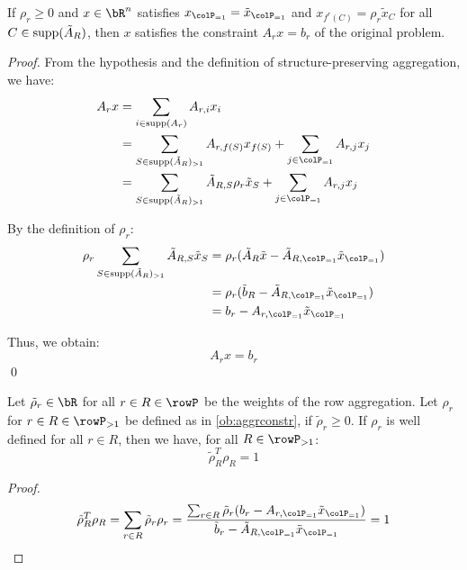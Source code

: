 {\begin{observation}
If \(\rho_r \geq 0\) and \(x \in \bR^n\) satisfies \(x_{\colP_{=1}} = \tilde{x}_{\colP_{=1}}\) and \(x_{f^r(C)} = \rho_r \tilde{x}_C\) for all \(C \in \operatorname{supp}(\tilde{A}_R)\), then \(x\) satisfies the constraint \(A_r x = b_r\) of the original problem.
\end{observation}

\begin{proof}
From the hypothesis and the definition of structure-preserving aggregation, we have:
\begin{align*}
A_r x &= \sum_{i \in \supp(A_r)} A_{r,i} x_i \\
&= \sum_{S \in \supp(\tilde{A}_R)_{>1}} A_{r,f(S)} x_{f(S)} + 
\sum_{j \in \colP_{=1}} A_{r,j} x_j \\
&= \sum_{S \in \supp(\tilde{A}_R)_{>1}} \tilde{A}_{R,S} \rho_r \tilde{x}_S + 
\sum_{j \in \colP_{=1}} A_{r,j} x_j
\end{align*}

By the definition of \(\rho_r\):
\begin{align*}
\rho_r \sum_{S \in \supp(\tilde{A}_R)_{>1}} \tilde{A}_{R,S} \tilde{x}_S 
&= \rho_r (\tilde{A}_R \tilde{x} - \tilde{A}_{R,\colP_{=1}} \tilde{x}_{\colP_{=1}}) \\
&= \rho_r (\tilde{b}_R - \tilde{A}_{R,\colP_{=1}} \tilde{x}_{\colP_{=1}}) \\
&= b_r - A_{r, \colP_{=1}} \tilde{x}_{\colP_{=1}}
\end{align*}

Thus, we obtain:
\[
A_r x = b_r
\]
\qed
\end{proof}

\begin{observation}
  \label{ob:rhoconvex}
  Let \(\tilde{\rho}_r \in \bR\) for all \(r \in R \in \rowP\) be the weights of the row aggregation.
  Let \(\rho_r\) for \(r \in R \in \rowP_{>1}\) be defined as in \ref{ob:aggrconstr}, if \(\tilde{\rho}_r \geq 0\). If \(\rho_r\) is well defined for all \(r \in R\), then we have, for all \(R \in \rowP_{>1}\):
  \begin{equation}
    \tilde{\rho}_R^T \rho_R = 1
  \end{equation}
\end{observation}
\begin{proof}
  \[
  \tilde{\rho}_R^T \rho_R = \sum_{r \in R} \tilde{\rho}_r \rho_r =  \frac{\sum_{r \in R}\tilde{\rho}_r(b_r - A_{r, \colP_{=1}} \tilde{x}_{\colP_{=1}})}{\tilde{b}_r
  - \tilde{A}_{R, \colP_{=1}} \tilde{x}_{\colP_{=1}}} = 1
  \] 
\end{proof}

}
